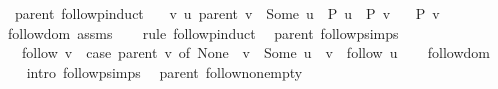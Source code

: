 \begin{isabellebody}
\endisatagproof
{\isafoldproof}%
%
\isadelimproof
\isanewline
%
\endisadelimproof
%
\isadeliminvisible
\isanewline
%
\endisadeliminvisible
%
\isataginvisible
{}\isamarkupfalse%
\ {\isacharparenleft}{\kern0pt}\ parent{\isacharparenright}{\kern0pt}\ follow{\isacharunderscore}{\kern0pt}pinduct{\isacharcolon}{\kern0pt}\isanewline
\ \ \ {\isachardoublequoteopen}{\isasymAnd}v{\isachardot}{\kern0pt}\ {\isacharparenleft}{\kern0pt}{\isasymAnd}u{\isachardot}{\kern0pt}\ parent\ v\ {\isacharequal}{\kern0pt}\ Some\ u\ {\isasymLongrightarrow}\ P\ u{\isacharparenright}{\kern0pt}\ {\isasymLongrightarrow}\ P\ v{\isachardoublequoteclose}\isanewline
\ \ \ {\isachardoublequoteopen}P\ v{\isachardoublequoteclose}%
\endisataginvisible
{\isafoldinvisible}%
%
\isadeliminvisible
\isanewline
%
\endisadeliminvisible
%
\isadelimproof
\ \ %
\endisadelimproof
%
\isatagproof
{}\isamarkupfalse%
\ follow{\isacharunderscore}{\kern0pt}dom\ assms\isanewline
\ \ \isamarkupfalse%
\ {\isacharparenleft}{\kern0pt}rule\ follow{\isachardot}{\kern0pt}pinduct{\isacharparenright}{\kern0pt}%
\endisatagproof
{\isafoldproof}%
%
\isadelimproof
\isanewline
%
\endisadelimproof
%
\isadeliminvisible
\isanewline
%
\endisadeliminvisible
%
\isataginvisible
{}\isamarkupfalse%
\ {\isacharparenleft}{\kern0pt}\ parent{\isacharparenright}{\kern0pt}\ follow{\isacharunderscore}{\kern0pt}psimps{\isacharcolon}{\kern0pt}\isanewline
\ \ \ {\isachardoublequoteopen}follow\ v\ {\isacharequal}{\kern0pt}\ {\isacharparenleft}{\kern0pt}case\ parent\ v\ of\ None\ {\isasymRightarrow}\ {\isacharbrackleft}{\kern0pt}v{\isacharbrackright}{\kern0pt}\ {\isacharbar}{\kern0pt}\ Some\ u\ {\isasymRightarrow}\ v\ {\isacharhash}{\kern0pt}\ follow\ u{\isacharparenright}{\kern0pt}{\isachardoublequoteclose}%
\endisataginvisible
{\isafoldinvisible}%
%
\isadeliminvisible
\isanewline
%
\endisadeliminvisible
%
\isadelimproof
\ \ %
\endisadelimproof
%
\isatagproof
{}\isamarkupfalse%
\ follow{\isacharunderscore}{\kern0pt}dom\isanewline
\ \ \isamarkupfalse%
\ {\isacharparenleft}{\kern0pt}intro\ follow{\isachardot}{\kern0pt}psimps{\isacharparenright}{\kern0pt}%
\endisatagproof
{\isafoldproof}%
%
\isadelimproof
\isanewline
%
\endisadelimproof
%
\isadeliminvisible
\isanewline
%
\endisadeliminvisible
%
\isataginvisible
{}\isamarkupfalse%
\ {\isacharparenleft}{\kern0pt}\ parent{\isacharparenright}{\kern0pt}\ follow{\isacharunderscore}{\kern0pt}non{\isacharunderscore}{\kern0pt}empty{\isacharcolon}{\kern0pt}\isanewline

\end{isabellebody}
